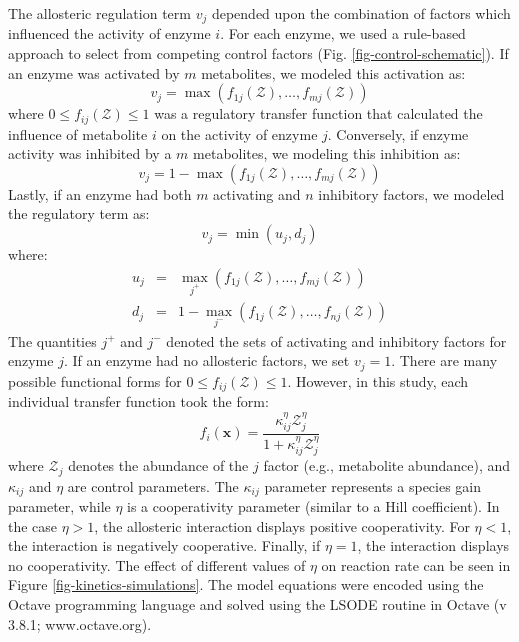 \documentclass[12pt]{article}
\begin{document}
The allosteric regulation term $v_{j}$ depended upon the combination of factors which influenced the activity of enzyme $i$.
For each enzyme, we used a rule-based approach to select from competing control factors (Fig. \ref{fig-control-schematic}). 
If an enzyme was activated by $m$ metabolites, we modeled this activation as:
\begin{equation}
	v_{j} = \max\left(f_{1j}\left(\mathcal{Z}\right),\hdots,f_{mj}\left(\mathcal{Z}\right)\right)
\end{equation}where $0\leq f_{ij}\left(\mathcal{Z}\right)\leq 1$ was a regulatory transfer function that calculated the influence of metabolite $i$ on the activity of enzyme $j$. 
Conversely, if enzyme activity was inhibited by a $m$ metabolites, we modeling this inhibition as:
\begin{equation}
	v_{j} = 1 - \max\left(f_{1j}\left(\mathcal{Z}\right),\hdots,f_{mj}\left(\mathcal{Z}\right)\right)
\end{equation}Lastly, if an enzyme had both $m$ activating and $n$ inhibitory factors, we modeled the regulatory term as:
\begin{equation}
	v_{j} = \min\left(u_{j},d_{j}\right)
\end{equation}where:
\begin{eqnarray}
	u_{j} &=& \max_{j^{+}}\left(f_{1j}\left(\mathcal{Z}\right),\hdots,f_{mj}\left(\mathcal{Z}\right)\right) \\
	d_{j} &=& 1 - \max_{j^{-}}\left(f_{1j}\left(\mathcal{Z}\right),\hdots,f_{nj}\left(\mathcal{Z}\right)\right)
\end{eqnarray}
The quantities $j^{+}$ and $j^{-}$ denoted the sets of activating and inhibitory factors for enzyme $j$. 
If an enzyme had no allosteric factors, we set $v_{j} = 1$.
There are many possible functional forms for $0\leq f_{ij}\left(\mathcal{Z}\right)\leq 1$. 
However, in this study, each individual transfer function took the form:
\begin{equation}\label{eqn:control-factor}
	f_{i}\left(\mathbf{x}\right) = \frac{\kappa_{ij}^{\eta}\mathcal{Z}_{j}^{\eta}}{1 + \kappa_{ij}^{\eta}\mathcal{Z}_{j}^{\eta}}
\end{equation}where $\mathcal{Z}_{j}$ denotes the abundance of the $j$ factor (e.g., metabolite abundance), and $\kappa_{ij}$ and $\eta$ are control parameters. 
The $\kappa_{ij}$ parameter represents a species gain parameter, while $\eta$ is a cooperativity parameter (similar to a Hill coefficient). 
In the case $\eta>1$, the allosteric interaction displays positive cooperativity. For $\eta<1$, the interaction is negatively cooperative. Finally, if $\eta=1$, the interaction displays no cooperativity. 
The effect of different values of $\eta$ on reaction rate can be seen in Figure \ref{fig-kinetics-simulations}.
The model equations were encoded using the Octave programming language and solved using the LSODE routine in Octave (v 3.8.1; www.octave.org).
\end{document}
